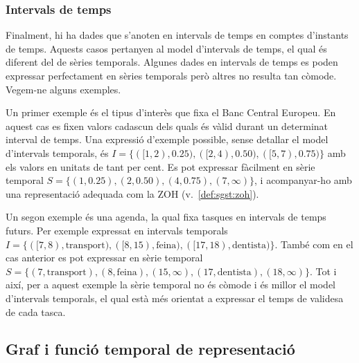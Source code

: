 \subsubsection{Intervals de temps}

Finalment, hi ha dades que s'anoten en intervals de temps en comptes
d'instants de temps. Aquests casos pertanyen al model d'intervals de
temps, el qual és diferent del de sèries temporals. Algunes dades en
intervals de temps es poden expressar perfectament en sèries temporals
però altres no resulta tan còmode. Vegem-ne alguns exemples.


Un primer exemple és el tipus d'interès que fixa el Banc Central
Europeu. En aquest cas es fixen valors cadascun dels quals és vàlid
durant un determinat interval de temps. Una expressió d'exemple
possible, sense detallar el model d'intervals temporals, és
$I=\{([1,2),0.25),([2,4),0.50),([5,7),0.75)\}$ amb els valors en
unitats de tant per cent. Es pot expressar fàcilment en sèrie temporal
$S=\{(1,0.25),(2,0.50),(4,0.75),(7,\infty)\}$, i acompanyar-ho amb una
representació adequada com la ZOH (v.~\autoref{def:sgst:zoh}).


Un segon exemple és una agenda, la qual fixa tasques en intervals de
temps futurs. Per exemple expressat en intervals temporals
$I=\{([7,8),\text{transport}),([8,15),\text{feina}),([17,18),
\text{dentista})\}$. També com en el cas anterior es pot expressar en
sèrie temporal $S=\{(7,\text{transport}),(8,\text{feina}), (15,\infty)
,(17,\text{dentista}), (18,\infty)\}$. Tot i així, per a aquest
exemple la sèrie temporal no és còmode i és millor el model
d'intervals temporals, el qual està més orientat a expressar
el temps de validesa de cada tasca.











\subsection{Graf i funció temporal de representació}
\label{sec:model:repr}

